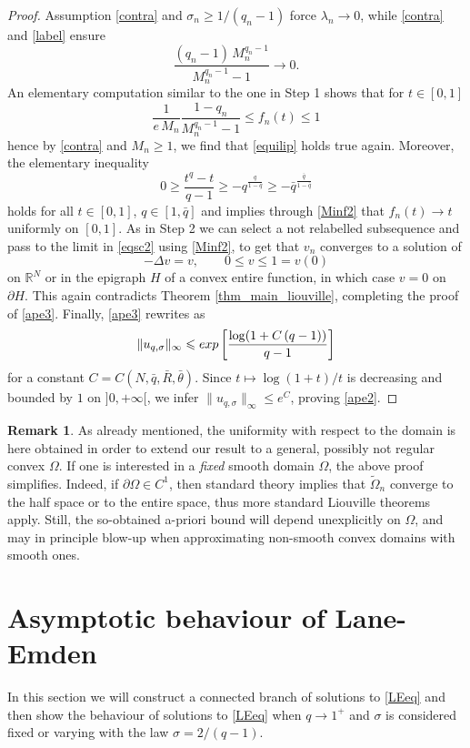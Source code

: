 \documentclass[12pt]{amsart}
\numberwithin{equation}{section}
\theoremstyle{plain}
\theoremstyle{plain}
\theoremstyle{plain}
\theoremstyle{definition}
\newtheorem{remark}[theorem]{Remark}
\newcommand{\R}{{\mathbb R}}
\newcommand{\beq}{\begin{equation}}
\newcommand{\eeq}{\end{equation}}
\renewcommand{\le}{\leqslant}
\renewcommand{\ge}{\geqslant}
\begin{document}
\begin{proof}
Assumption \eqref{contra} and $\sigma_n\ge 1/(q_n-1)$ force $\lambda_n\to 0$, while \eqref{contra} and \eqref{label} ensure
\beq
\label{Minf2}
\frac{(q_n-1) \, M_n^{q_n-1}}{M_n^{q_n-1}-1}\to 0.
\eeq
 An elementary computation similar to the one in Step 1 shows that for $t\in [0, 1]$
\[
\frac{1}{e\, M_n}
\frac{1-q_n}{M_n^{q_n-1}-1}\le f_n(t)\le 1
\]
hence by \eqref{contra} and $M_n\ge 1$, we find that \eqref{equilip} holds true again. 
Moreover, the elementary inequality
\[
0\ge \frac{t^q-t}{q-1}\ge -q^{\frac{q}{1-q}}\ge -\bar q^{\frac{\bar q}{1-\bar q}}
\]
holds for all $t\in [0, 1]$, $q\in [1, \bar q]$ and implies through \eqref{Minf2} that $f_n(t)\to t$ uniformly on $[0, 1]$. 
As in Step 2  we can select a not relabelled subsequence and pass to the limit in \eqref{eqsc2} using \eqref{Minf2}, to get that $v_n$ converges to a solution of 
\[
-\Delta v=v, \qquad 0\le v\le 1= v(0)
\]
on $\R^N$ or in the epigraph $H$ of a convex entire function, in which case $v=0$ on $\partial H$. 
This again contradicts Theorem \ref{thm_main_liouville}, completing the proof of \eqref{ape3}. 
Finally, \eqref{ape3} rewrites as
\[
\|u_{q, \sigma}\|_\infty\le {\rm exp}\left[ \frac{\log(1+C\, (q-1))}{q-1}\right]
\]
for a constant $C=C(N, \bar q, \bar R, \bar\theta)$. Since $t\mapsto \log(1+t)/t$ is decreasing and bounded by $1$ on $]0, +\infty[$, we infer $\|u_{q, \sigma}\|_\infty\le e^C$, proving \eqref{ape2}. 
 \end{proof}

\begin{remark}
\label{rem_simplification}
As already mentioned, the uniformity with respect to the domain is here obtained in order to extend our result to a general, possibly not regular convex $\Omega$. If one is interested in a {\em fixed} smooth domain $\Omega$, the above proof simplifies. 
Indeed, if $\partial \Omega\in C^1$, then standard theory implies that $\widetilde{\Omega}_n$ converge to the half space or to the entire space, thus more standard Liouville theorems apply. 
Still, the so-obtained a-priori bound will depend unexplicitly on $\Omega$, and may in principle blow-up when approximating non-smooth convex domains with smooth ones. 
\end{remark}



 \section{Asymptotic behaviour of Lane-Emden}
 \label{sec_ALE}
 In this section we will construct a connected branch of solutions to \eqref{LEeq} and then show the behaviour of solutions to \eqref{LEeq} when $q\to 1^+$ and $\sigma$ is considered fixed or varying with the law $\sigma=2/(q-1)$.
\end{document}

